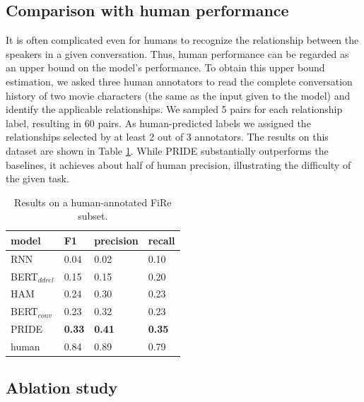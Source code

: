 \subsection{Comparison with human performance}

It is often complicated even for humans to recognize the relationship between the speakers in a given conversation. 
Thus, human performance can be regarded as an upper bound on the model's performance. 
To obtain this upper bound estimation, we asked three human annotators to read the complete conversation history of two movie characters (the same as the input given to the model) and identify the applicable relationships.
We sampled 5 pairs for each relationship label, resulting in 60 pairs. As human-predicted labels we assigned the relationships selected by at least 2 out of 3 annotators.
The results on this dataset are shown in Table \ref{tab:human_exp}.
While PRIDE substantially outperforms the baselines, it achieves about half of human precision, illustrating the difficulty of the given task.


\begin{table}[]
\centering
\begin{adjustbox}{width=0.43\textwidth}
\begin{tabular}{@{}llll@{}}
\textbf{model}           & \textbf{F1}   & \textbf{precision} & \textbf{recall} \\ \toprule
RNN        & 0.04     & 0.02            & 0.10          \\
BERT$_{ddrel}$ & 0.15     & 0.15            & 0.20          \\
HAM        & 0.24     & 0.30             & 0.23         \\
BERT$_{conv}$  & 0.23     & 0.32            & 0.23         \\
PRIDE      & \textbf{0.33}     & \textbf{0.41}            & \textbf{0.35}         \\ \midrule
human      & 0.84     & 0.89            & 0.79        
\end{tabular}
\end{adjustbox}
\caption{Results on a human-annotated FiRe subset.}
\label{tab:human_exp}
\end{table}

\subsection{Ablation study}


